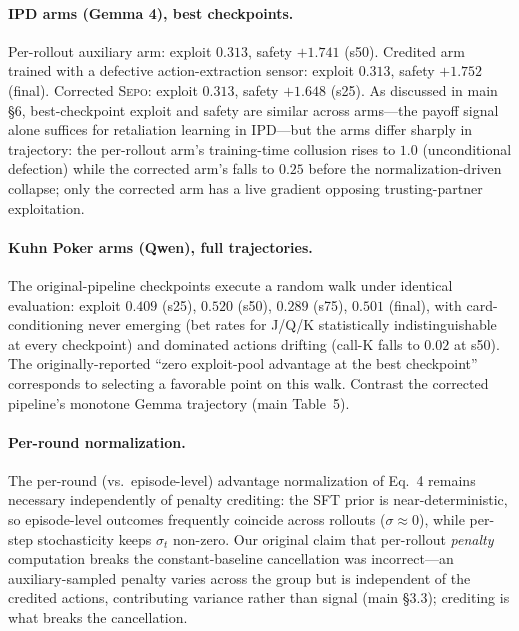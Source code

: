 \documentclass[letterpaper]{article} %
\newcommand{\sepo}{\textsc{Sepo}}
\begin{document}
\paragraph{IPD arms (Gemma 4), best checkpoints.} Per-rollout auxiliary arm: exploit $0.313$, safety $+1.741$ (s50). Credited arm trained with a defective action-extraction sensor: exploit $0.313$, safety $+1.752$ (final). Corrected \sepo{}: exploit $0.313$, safety $+1.648$ (s25). As discussed in main \S6, best-checkpoint exploit and safety are similar across arms---the payoff signal alone suffices for retaliation learning in IPD---but the arms differ sharply in trajectory: the per-rollout arm's training-time collusion rises to $1.0$ (unconditional defection) while the corrected arm's falls to $0.25$ before the normalization-driven collapse; only the corrected arm has a live gradient opposing trusting-partner exploitation.
\paragraph{Kuhn Poker arms (Qwen), full trajectories.} The original-pipeline checkpoints execute a random walk under identical evaluation: exploit $0.409$ (s25), $0.520$ (s50), $0.289$ (s75), $0.501$ (final), with card-conditioning never emerging (bet rates for J/Q/K statistically indistinguishable at every checkpoint) and dominated actions drifting (call-K falls to $0.02$ at s50). The originally-reported ``zero exploit-pool advantage at the best checkpoint'' corresponds to selecting a favorable point on this walk. Contrast the corrected pipeline's monotone Gemma trajectory (main Table~5).
\paragraph{Per-round normalization.} The per-round (vs.\ episode-level) advantage normalization of Eq.~4 remains necessary independently of penalty crediting: the SFT prior is near-deterministic, so episode-level outcomes frequently coincide across rollouts ($\sigma \approx 0$), while per-step stochasticity keeps $\sigma_t$ non-zero. Our original claim that per-rollout \emph{penalty} computation breaks the constant-baseline cancellation was incorrect---an auxiliary-sampled penalty varies across the group but is independent of the credited actions, contributing variance rather than signal (main \S3.3); crediting is what breaks the cancellation.
\end{document}
